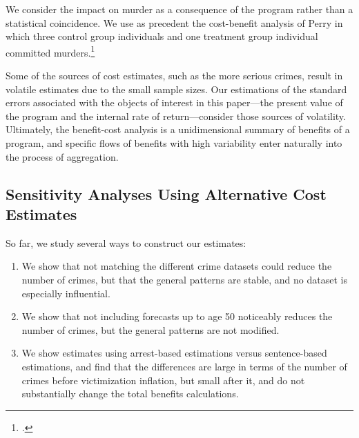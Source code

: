 \noindent We consider the impact on murder as a consequence of the program rather than a statistical coincidence. We use as precedent the cost-benefit analysis of Perry in which three control group individuals and one treatment group individual committed murders.\footnote{\citet{Heckman_Moon_etal_2010_RateofReturn}.} 

Some of the sources of cost estimates, such as the more serious crimes, result in volatile estimates due to the small sample sizes. Our estimations of the standard errors associated with the objects of interest in this paper---the present value of the program and the internal rate of return---consider those sources of volatility. Ultimately, the benefit-cost analysis is a unidimensional summary of benefits of a program, and specific flows of benefits with high variability enter naturally into the process of aggregation. 

%

\subsection{Sensitivity Analyses Using Alternative Cost Estimates}
\noindent So far, we study several ways to construct our estimates: 

\begin{enumerate}
\item We show that not matching the different crime datasets could reduce the number of crimes, but that the general patterns are stable, and no dataset is especially influential.
\item We show that not including forecasts up to age 50 noticeably reduces the number of crimes, but the general patterns are not modified.
\item We show estimates using arrest-based estimations versus sentence-based estimations, and find that the differences are large in terms of the number of crimes before victimization inflation, but small after it, and do not substantially change the total benefits calculations.
\end{enumerate}

